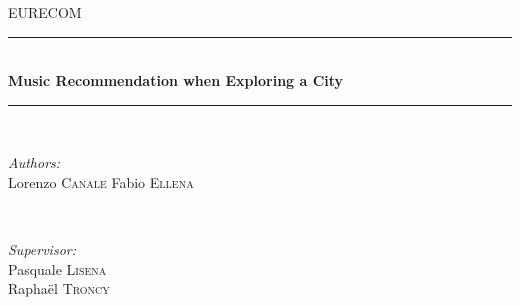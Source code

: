 \documentclass[paper=a4, fontsize=11pt]{scrartcl}
\begin{document}
\begin{titlepage}

\newcommand{\HRule}{\rule{\linewidth}{0.5mm}} %

\center %
 

\textsc{\LARGE EURECOM}\\[1.5cm] %


\HRule \\[0.4cm]
{ \huge \bfseries Music Recommendation when Exploring a City}\\[0.4cm] %
\HRule \\[1.5cm]
 

\begin{minipage}{0.4\textwidth}
\begin{flushleft} \large
\emph{Authors:}\\
Lorenzo \textsc{Canale} %
\newline
Fabio \textsc{Ellena} %
\end{flushleft}
\end{minipage}
~
\begin{minipage}{0.4\textwidth}
\begin{flushright} \large
\emph{Supervisor:} \\
Pasquale \textsc{Lisena} \\ %
Raphaël  \textsc{Troncy} %
\end{flushright}
\end{minipage}\\[2cm]


\end{titlepage}
\end{document}
